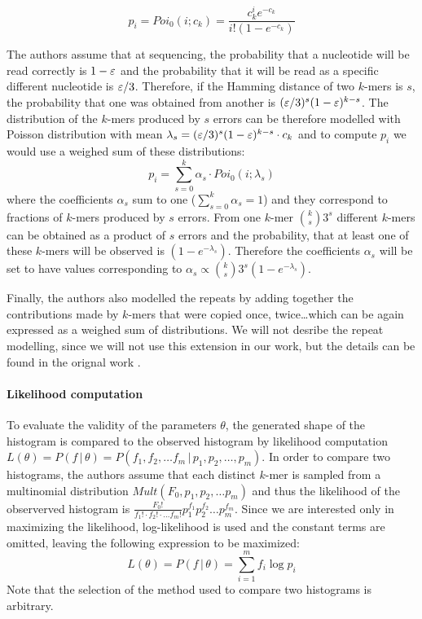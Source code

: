 $$ p_i = Poi_0(i; c_k) = \frac{c_k^i e^{-c_k}}{i!(1 - e^{-c_k})} $$

The authors assume that at sequencing, the probability that a nucleotide will be read
correctly is $1-\varepsilon$ and the probability that it will be read as a specific different
nucleotide is $\varepsilon/3$. Therefore, if the Hamming distance of two $k$-mers is $s$, the
probability that one was obtained from another is $(\varepsilon/3)^s(1-\varepsilon)^{k-s}$. The distribution 
of the $k$-mers produced by $s$ errors can be therefore modelled with Poisson distribution with mean
$\lambda_s = (\varepsilon/3)^s(1-\varepsilon)^{k-s} \cdot c_k$ and to compute $p_i$ we would use
a weighed sum of these distributions:
$$ p_i = \sum_{s=0}^k \alpha_s \cdot Poi_0(i; \lambda_s) $$
where the coefficients $\alpha_s$ sum to one ($\sum_{s=0}^k \alpha_s = 1$) and they correspond
to fractions of $k$-mers produced by $s$ errors. From one $k$-mer ${k \choose s} 3^s$ 
different $k$-mers can be obtained as a product of $s$ errors and the probability, 
that at least one of these $k$-mers will be observed is $(1 - e^{-\lambda_s})$. 
Therefore the coefficients $\alpha_s$ will be set to have values corresponding to 
$\alpha_s \propto {k \choose s} 3^s(1 - e^{-\lambda_s})$.

Finally, the authors also modelled the repeats by adding together the contributions made by
$k$-mers that were copied once, twice\dots which can be again expressed as a weighed sum of
distributions. We will not desribe the repeat modelling, since we will not use this extension
in our work, but the details can be found in the orignal work \cite{Hozza2015, Hozza2016}.  


\paragraph{Likelihood computation}
To evaluate the validity of the parameters $\theta$, the generated shape of the histogram is
compared to the observed histogram by likelihood computation
$L(\theta) = P(f\,|\,\theta) = P(f_1, f_2, \dots f_m\,|\,p_1, p_2, \dots, p_m)$. In order to
compare two histograms, the authors assume that each distinct $k$-mer is sampled
from a multinomial distribution $Mult(F_0, p_1, p_2, \dots p_m)$ and thus the
likelihood of the observerved histogram is 
$\frac{F_0!}{f_1! \cdot f_2! \cdot \dots f_m!} p_1^{f_1} p_2^{f_2} \dots p_m ^{f_m}$.
Since we are interested only in maximizing the likelihood, log-likelihood is used and
the constant terms are omitted, leaving the following expression to be maximized:
$$L(\theta) = P(f\,|\,\theta) = \sum_{i=1}^m f_i \log p_i$$
Note that the selection of the method used to compare two histograms is arbitrary.

